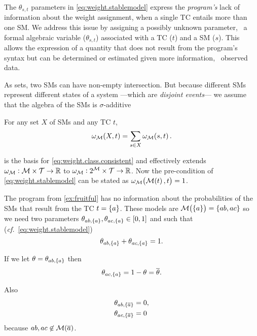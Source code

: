 \documentclass[x11names]{tlp}
\begin{document}
The $\theta_{s,t}$ parameters in \cref{eq:weight.stablemodel} express the \emph{program's} lack of information about the weight assignment, when a single \acl{TC} entails more than one \acl{SM}.
We address this issue by assigning a possibly unknown parameter, \ie~a formal algebraic variable ($\theta_{s,t}$) associated with a \acl{TC} ($t$) and a \acl{SM} ($s$).
This allows the expression of a quantity that does not result from the program's syntax but can be determined or estimated given more information, \eg\ observed data.

As sets, two \aclp{SM} can have non-empty intersection.
But because different \acp{SM} represent different states of a system ---which are \emph{disjoint events}--- we assume that the algebra of the \aclp{SM} is $\sigma$-additive

\begin{assumption}
	\label{assumption:smodels.disjoint}%

	For any set $X$ of \aclp{SM} and any \acl{TC} $t$,
	\begin{equation}
		\wgtM\at{X, t} = \sum_{s\in X}\wgtM\at{s, t}.\label{eq:smodels.disjoint}
	\end{equation}

\end{assumption}

 is the basis for \cref{eq:weight.class.consistent} and effectively extends $\omega_{{\mathcal{M}}}:{\mathcal{M}} \times {\mathcal{T}} \to \mathbb{R}$ to $\omega_{{\mathcal{M}}}:\mathrm{2}^{{\mathcal{M}}} \times {\mathcal{T}} \to \mathbb{R}$.
Now the pre-condition of \cref{eq:weight.stablemodel} can be stated as $\wgtM\at{\MODELset\at{t}, t} = 1$.

\ifExamples
	\begin{example}
		\label{ex:models.parameters}
		\em

		The program from \cref{ex:fruitful} has no information about the
		probabilities of the \aclp{SM} that result from the \acl{TC} $t = \set{a}$.
		These models are $\MODELset\at{\set{a}} = \set{ab, ac}$ so we need two
		parameters $\theta_{ab, \set{a}}, \theta_{ac, \set{a}} \in \intcc{0,1}$ and
		such that (\textit{cf.}\ \cref{eq:weight.stablemodel})
		\begin{equation*}
			\theta_{ab, \set{a}} + \theta_{ac, \set{a}} = 1.
		\end{equation*}

		If we let $\theta = \theta_{ab, \set{a}}$ then
		\begin{equation*}
			\theta_{ac, \set{a}} = 1 - \theta = \overline{\theta}.
		\end{equation*}

		Also
		\begin{equation*}
			\begin{split}
				\theta_{ab, \set{\co{a}}} & = 0, %
				\\
				\theta_{ac, \set{\co{a}}} & = 0
			\end{split}
		\end{equation*}
		because $ab, ac \not\in\MODELset\at{\co{a}}$.
	\end{example}
\fi
\end{document}
